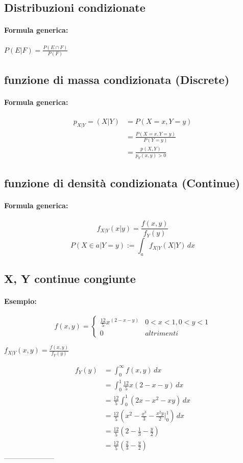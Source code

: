 \documentclass[]{article}
\newcommand{\formula}{\paragraph{Formula generica:}}
\begin{document}
    \subsection{Distribuzioni condizionate}
    \formula $P(E|F) = \frac{P(E \cap F)}{P(F)}$

    \subsection{funzione di massa condizionata (Discrete)}
    \formula
    \begin{equation*}
        \begin{split}
            p_{X|Y} = (X | Y) & = P (X=x, Y=y) \\
            & = \frac{P(X=x, Y=y)}{P(Y=y)} \\
            & = \frac{p(X,Y)}{p_Y(x, y) > 0} 
        \end{split}
    \end{equation*}

    \subsection{funzione di densità condizionata (Continue)}
    \formula
    \[ f_{X|Y}(x | y) = \frac{f(x, y)}{f_Y(y)}\]
    \[ P(X \in a | Y = y) := \int_{a}^{} f_{X|Y}(X | Y) \, dx \]

    \subsection{X, Y continue congiunte}
    \paragraph{Esempio:}
    \begin{equation*}
        f(x,y) =
        \begin{cases}
            \frac{12}{5} x^{(2-x-y)} & 0 < x < 1, 0 < y < 1 \\
            0 & altrimenti
        \end{cases}
    \end{equation*}

    $ f_{X|Y}(x,y) = \frac{f(x,y)}{f_Y(y)} $

    \begin{equation*}
        \begin{split}
            f_Y(y) & = \int_{0}^{\infty} f(x,y) \, dx \\
            & = \int_{0}^{1} \frac{12}{5} x(2-x-y) \, dx \\
            & = \frac{12}{5} \int_{0}^{1} (2x - x^2 - xy) \, dx \\
            & = \frac{12}{5} (x^2 - \frac{x^3}{3} - \frac{x^2y}{2} \bigg\rvert_{0}^{1} )  \, dx \\
            & = \frac{12}{5} (2 - \frac{1}{3} - \frac{y}{2}) \\
            & = \frac{12}{5} (\frac{2}{3} - \frac{y}{2})
        \end{split}
    \end{equation*}
    ---------------------
\end{document}
